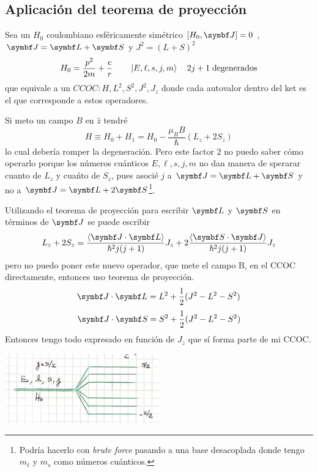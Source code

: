 \documentclass[10pt,oneside]{CBFT_book}
\begin{document}
\subsection{Aplicación del teorema de proyección}

Sea un $H_0$ coulombiano esféricamente simétrico $[H_0,\vb{J}]=0$ , $\vb{J}=\vb{L}+\vb{S}$ y $J^2=(L+S)^2$
\[
	H_0 = \frac{p^2}{2m} + \frac{e}{r} \qquad \Ket{E,\ell,s,j,m} \quad 2j+1 \;\text{degenerados}
\]
que equivale a un $CCOC:H,L^2,S^2,J^2,J_z$ donde cada autovalor dentro del ket es el que corresponde a estos 
operadores.

Si meto un campo $B$ en $\hat{z}$ tendré 
\[
	H \equiv H_0 + H_1 = H_0 - \frac{\mu_B B}{\hbar}(L_z + 2S_z)
\]
lo cual debería romper la degeneración.
Pero este factor $2$ no puedo saber cómo operarlo porque los números cuánticos $E,\ell,s,j,m$ no dan
manera de sperarar cuanto de $L_z$ y cuańto de $S_z$, pues asocié $j$ a $\vb J = \vb L + \vb S$ y no a 
$\vb J = \vb L + 2 \vb S$\footnote{Podría hacerlo con {\it brute force} pasando a una base desacoplada
donde tengo $m_{\ell}$ y $m_s$ como números cuánticos.}.

Utilizando el teorema de proyección para escribir $\vb L$  y $\vb S$ en términos de $\vb J$ se puede
escribir
\[
	L_z + 2S_z = \frac{\Braket{\vb{J}\cdot\vb{L}}}{\hbar^2j(j+1)}J_z + 
		2\frac{\Braket{\vb{S}\cdot\vb{J}}}{\hbar^2j(j+1)}J_z
\]
pero no puedo poner este nuevo operador, que mete el campo B, en el CCOC directamente, entonces uso teorema 
de proyección.
\[
	\vb{J}\cdot\vb{L} = L^2 + \frac{1}{2}( J^2 - L^2 - S^2 )
\]
\[
	\vb{J}\cdot\vb{S} = S^2 + \frac{1}{2}( J^2 - L^2 - S^2 )
\]
Entonces tengo todo expresado en función de $J_z$ que sí forma parte de mi CCOC.

\includegraphics[width=0.5\textwidth]{images/fig_ft2_H_proy.jpg}
\end{document}
